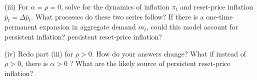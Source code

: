 \documentclass[answers]{exam}
\begin{document}
\begin{questions}
(iii) For $\alpha=\rho=0$, solve for the dynamics of inflation $\pi_{t}$ and reset-price inflation $\bar{p}_{t}=\Delta \bar{p}_{t}$. What processes do these two series follow? If there is a one-time permanent expansion in aggregate demand $m_{t}$, could this model account for persistent inflation? persistent reset-price inflation?

(iv) Redo part (iii) for $\rho>0$. How do your answers change? What if instead of $\rho>0$, there is $\alpha>0$ ? What are the likely source of persistent reset-price inflation?



\end{questions}
\end{document}
